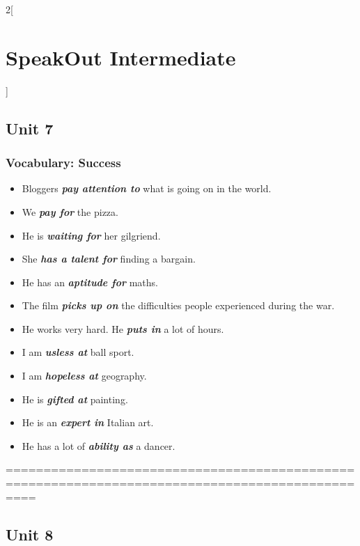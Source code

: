 \documentclass[10pt,a4paper]{article}
\newlength{\OriginalParIndent}
\newcommand\ex[1]{\textit{\textbf{{#1}}}}           %
\newenvironment{ItemizeWithOrigParIndent}
    {\begin{itemize}[leftmargin=\OriginalParIndent]}
    {\end{itemize}}
\begin{document}
\begin{multicols}{2}[\section{SpeakOut Intermediate}]
\subsection{Unit 7}
\subsubsection{Vocabulary: Success}
\begin{ItemizeWithOrigParIndent}
    \item Bloggers \ex{pay attention to} what is going on in the world.
    \item We \ex{pay for} the pizza.
    \item He is \ex{waiting for} her gilgriend.
    \item She \ex{has a talent for} finding a bargain.
    \item He has an \ex{aptitude for} maths.
    \item The film \ex{picks up on} the difficulties people experienced during the war.
    \item He works very hard. He \ex{puts in} a lot of hours.
    \item I am \ex{usless at} ball sport.
    \item I am \ex{hopeless at} geography.
    \item He is \ex{gifted at} painting.
    \item He is an \ex{expert in} Italian art.
    \item He has a lot of \ex{ability as} a dancer.
\end{ItemizeWithOrigParIndent}






 ================================================================================================
\subsection{Unit 8}


\end{multicols}
\end{document}
